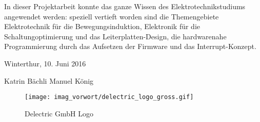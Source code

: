 In dieser Projektarbeit konnte das ganze Wissen des Elektrotechnikstudiums angewendet werden: speziell vertieft worden sind die Themengebiete Elektrotechnik für die Bewegungsinduktion, Elektronik für die Schaltungoptimierung und das Leiterplatten-Design, die hardwarenahe Programmierung durch das Aufsetzen der Firmware und das Interrupt-Konzept. 


Winterthur, 10. Juni 2016


 Katrin Bächli 
Manuel König



\begin{figure}[ht]
   \texttt{[image: imag\_vorwort/delectric\_logo\_gross.gif]}
   \caption{Delectric GmbH Logo}
   \label{delectric_logo} 
\end{figure}




